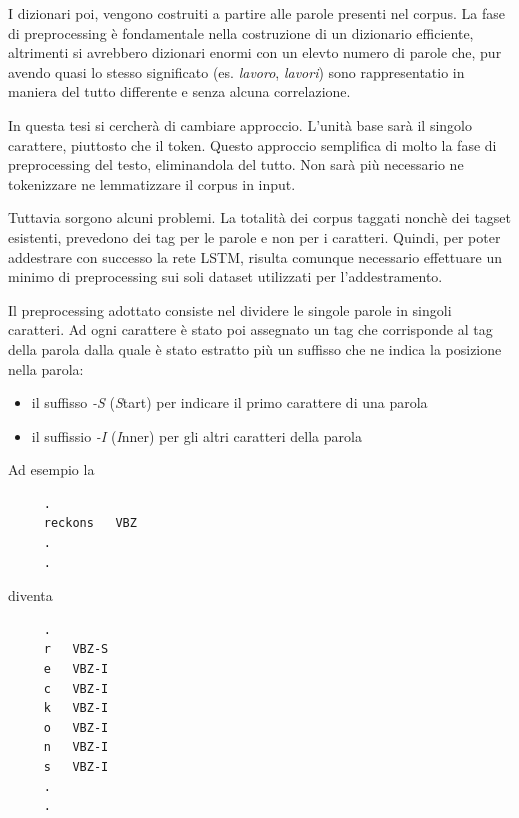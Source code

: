 I dizionari poi, vengono costruiti a partire alle parole presenti nel corpus.
La fase di preprocessing \`e fondamentale nella costruzione di un dizionario efficiente, altrimenti si avrebbero dizionari enormi con un elevto numero di parole che, pur avendo quasi lo stesso significato (es. \emph{lavoro}, \emph{lavori}) sono rappresentatio in maniera del tutto differente e senza alcuna correlazione.

In questa tesi si cercher\`a di cambiare approccio. L'unit\`a base sar\`a il singolo carattere, piuttosto che il token.
Questo approccio semplifica di molto la fase di preprocessing del testo, eliminandola del tutto.
Non sar\`a pi\`u necessario ne tokenizzare ne lemmatizzare il corpus in input.

Tuttavia sorgono alcuni problemi. La totalit\`a dei corpus taggati nonch\`e dei tagset esistenti, prevedono dei tag per le parole e non per i caratteri.
Quindi, per poter addestrare con successo la rete LSTM, risulta comunque necessario effettuare un minimo di preprocessing sui soli dataset utilizzati per l'addestramento.

Il preprocessing adottato consiste nel dividere le singole parole in singoli caratteri.
Ad ogni carattere \`e stato poi assegnato un tag che corrisponde al tag della parola dalla quale \`e stato estratto pi\`u un suffisso che ne indica la posizione nella parola:

\begin{itemize}
  \item il suffisso \emph{-S} (\emph{S}tart) per indicare il primo carattere di una parola
  \item il suffissio \emph{-I} (\emph{I}nner) per gli altri caratteri della parola
\end{itemize}

Ad esempio la

\begin{center}
  \begin{minipage}{5cm}
    \begin{verbatim}
     .
     reckons   VBZ
     .
     .
    \end{verbatim}
  \end{minipage}
\end{center}

diventa

\begin{center}
  \begin{minipage}{5cm}
    \begin{verbatim}
     .
     r   VBZ-S
     e   VBZ-I
     c   VBZ-I
     k   VBZ-I
     o   VBZ-I
     n   VBZ-I
     s   VBZ-I
     .
     .
    \end{verbatim}
  \end{minipage}
\end{center}

